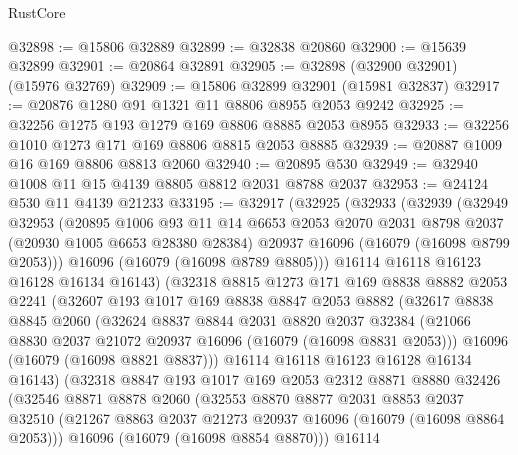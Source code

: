 \begin{lexlean}{RustCore}
\begin{coremodule}
@32898 := @15806 @32889
@32899 := @32838 @20860
@32900 := @15639 @32899
@32901 := @20864 @32891
@32905 := @32898 (@32900 @32901) (@15976 @32769)
@32909 := @15806 @32899 @32901 (@15981 @32837)
@32917 := @20876 @1280 @91 @1321 @11 @8806 @8955 @2053 @9242
@32925 := @32256 @1275 @193 @1279 @169 @8806 @8885 @2053 @8955
@32933 := @32256 @1010 @1273 @171 @169 @8806 @8815 @2053 @8885
@32939 := @20887 @1009 @16 @169 @8806 @8813 @2060
@32940 := @20895 @530
@32949 := @32940 @1008 @11 @15 @4139 @8805 @8812 @2031 @8788 @2037
@32953 := @24124 @530 @11 @4139 @21233
@33195 := @32917
    (@32925
      (@32933
        (@32939
          (@32949
            @32953
            (@20895
              @1006
              @93
              @11
              @14
              @6653
              @2053
              @2070
              @2031
              @8798
              @2037
              (@20930 @1005 @6653 @28380 @28384)
              @20937
              @16096
              (@16079 (@16098 @8799 @2053)))
            @16096
            (@16079 (@16098 @8789 @8805)))
          @16114
          @16118
          @16123
          @16128
          @16134
          @16143)
        (@32318
          @8815
          @1273
          @171
          @169
          @8838
          @8882
          @2053
          @2241
          (@32607
            @193
            @1017
            @169
            @8838
            @8847
            @2053
            @8882
            (@32617
              @8838
              @8845
              @2060
              (@32624
                @8837
                @8844
                @2031
                @8820
                @2037
                @32384
                (@21066 @8830 @2037 @21072 @20937 @16096 (@16079 (@16098 @8831 @2053)))
                @16096
                (@16079 (@16098 @8821 @8837)))
              @16114
              @16118
              @16123
              @16128
              @16134
              @16143)
            (@32318
              @8847
              @193
              @1017
              @169
              @2053
              @2312
              @8871
              @8880
              @32426
              (@32546
                @8871
                @8878
                @2060
                (@32553
                  @8870
                  @8877
                  @2031
                  @8853
                  @2037
                  @32510
                  (@21267 @8863 @2037 @21273 @20937 @16096 (@16079 (@16098 @8864 @2053)))
                  @16096
                  (@16079 (@16098 @8854 @8870)))
                @16114

\end{coremodule}
\end{lexlean}
